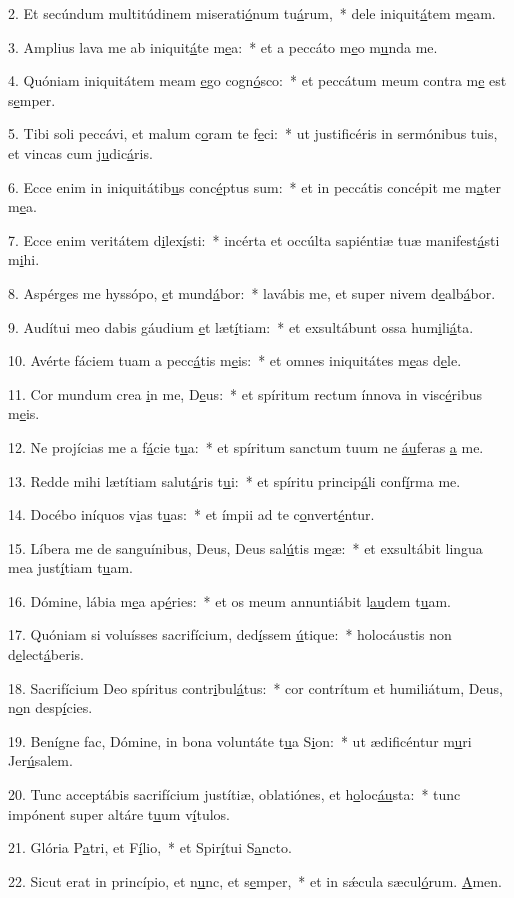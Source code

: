2. Et secúndum multitúdinem miserati\uline{ó}num tu\uline{á}rum,~* dele iniquit\uline{á}tem m\uline{e}am.\par 
3. Amplius lava me ab iniquit\uline{á}te m\uline{e}a:~* et a peccáto m\uline{e}o m\uline{u}nda me.\par 
4. Quóniam iniquitátem meam \uline{e}go cogn\uline{ó}sco:~* et peccátum meum contra m\uline{e} est s\uline{e}mper.\par 
5. Tibi soli peccávi, et malum c\uline{o}ram te f\uline{e}ci:~* ut justificéris in sermónibus tuis, et vincas cum j\uline{u}dic\uline{á}ris.\par 
6. Ecce enim in iniquitátib\uline{u}s conc\uline{é}ptus sum:~* et in peccátis concépit me m\uline{a}ter m\uline{e}a.\par 
7. Ecce enim veritátem d\uline{i}lex\uline{í}sti:~* incérta et occúlta sapiéntiæ tuæ manifest\uline{á}sti m\uline{i}hi.\par 
8. Aspérges me hyssópo, \uline{e}t mund\uline{á}bor:~* lavábis me, et super nivem d\uline{e}alb\uline{á}bor.\par 
9. Audítui meo dabis gáudium \uline{e}t læt\uline{í}tiam:~* et exsultábunt ossa hum\uline{i}li\uline{á}ta.\par 
10. Avérte fáciem tuam a pecc\uline{á}tis m\uline{e}is:~* et omnes iniquitátes m\uline{e}as d\uline{e}le.\par 
11. Cor mundum crea \uline{i}n me, D\uline{e}us:~* et spíritum rectum ínnova in visc\uline{é}ribus m\uline{e}is.\par 
12. Ne projícias me a f\uline{á}cie t\uline{u}a:~* et spíritum sanctum tuum ne \uline{áu}feras \uline{a} me.\par 
13. Redde mihi lætítiam salut\uline{á}ris t\uline{u}i:~* et spíritu princip\uline{á}li conf\uline{í}rma me.\par 
14. Docébo iníquos v\uline{i}as t\uline{u}as:~* et ímpii ad te c\uline{o}nvert\uline{é}ntur.\par 
15. Líbera me de sanguínibus, Deus, Deus sal\uline{ú}tis m\uline{e}æ:~* et exsultábit lingua mea just\uline{í}tiam t\uline{u}am.\par 
16. Dómine, lábia m\uline{e}a ap\uline{é}ries:~* et os meum annuntiábit l\uline{au}dem t\uline{u}am.\par 
17. Quóniam si voluísses sacrifícium, ded\uline{í}ssem \uline{ú}tique:~* holocáustis non d\uline{e}lect\uline{á}beris.\par 
18. Sacrifícium Deo spíritus contr\uline{i}bul\uline{á}tus:~* cor contrítum et humiliátum, Deus, n\uline{o}n desp\uline{í}cies.\par 
19. Benígne fac, Dómine, in bona voluntáte t\uline{u}a S\uline{i}on:~* ut ædificéntur m\uline{u}ri Jer\uline{ú}salem.\par 
20. Tunc acceptábis sacrifícium justítiæ, oblatiónes, et h\uline{o}loc\uline{áu}sta:~* tunc impónent super altáre t\uline{u}um v\uline{í}tulos.\par 
21. Glória P\uline{a}tri, et F\uline{í}lio,~* et Spir\uline{í}tui S\uline{a}ncto.\par 
22. Sicut erat in princípio, et n\uline{u}nc, et s\uline{e}mper,~* et in sǽcula sæcul\uline{ó}rum. \uline{A}men.\par 
